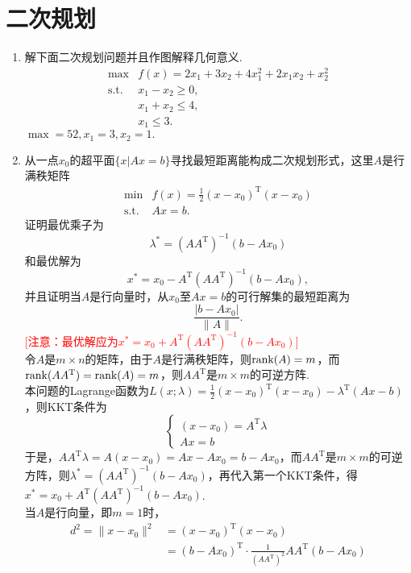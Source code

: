 \section{二次规划}
\begin{enumerate}
    \item 解下面二次规划问题并且作图解释几何意义.
    \[\begin{array}{lll}
        \max & f(x)=2x_1+3x_2+4x_1^2+2x_1x_2+x_2^2\\
        \mathrm{s.t.} & x_1-x_2 \geqslant 0,\\
        & x_1+x_2 \leqslant 4,\\
        & x_1 \leqslant 3.
    \end{array}\]
    \sol $\displaystyle \max=52,x_1=3,x_2=1.$
    \item 从一点$x_0$的超平面$\{x|Ax=b\}$寻找最短距离能构成二次规划形式，这里$A$是行满秩矩阵
    \[\begin{array}{lll}
        \min & \displaystyle f(x)=\frac{1}{2}(x-x_0)^\mathrm{T}(x-x_0)\\
        \mathrm{s.t.} & Ax=b.
    \end{array}\]
    证明最优乘子为\[\lambda^*=(AA^\mathrm{T})^{-1}(b-Ax_0)\]和最优解为\[x^*=x_0-A^\mathrm{T}(AA^\mathrm{T})^{-1}(b-Ax_0),\]
    并且证明当$A$是行向量时，从$x_0$至$Ax = b$的可行解集的最短距离为\[\frac{|b-Ax_0|}{\|A\|}.\]
    \textcolor{red}{[注意：最优解应为$x^*=x_0+A^\mathrm{T}(AA^\mathrm{T})^{-1}(b-Ax_0)$]}\\
    \pro 令$A$是$m \times n$的矩阵，由于$A$是行满秩矩阵，则$\text{rank}(A)=m$，而$\text{rank}(AA^\mathrm{T})=\text{rank}(A)=m$，则$AA^\mathrm{T}$是$m \times m$的可逆方阵.\\
    本问题的Lagrange函数为$\displaystyle L(x;\lambda)=\frac{1}{2}(x-x_0)^\mathrm{T}(x-x_0)-\lambda^\mathrm{T}(Ax-b)$，则KKT条件为
    \[\begin{cases}
        (x-x_0)=A^\mathrm{T}\lambda\\
        Ax=b
    \end{cases}\]
    于是，$AA^\mathrm{T}\lambda=A(x-x_0)=Ax-Ax_0=b-Ax_0$，而$AA^\mathrm{T}$是$m \times m$的可逆方阵，则$\lambda^*=(AA^\mathrm{T})^{-1}(b-Ax_0)$，再代入第一个KKT条件，得$x^*=x_0+A^\mathrm{T}(AA^\mathrm{T})^{-1}(b-Ax_0)$.\\
    当$A$是行向量，即$m=1$时，
    \begin{align*}
        d^2 = \|x-x_0\|^2 & =(x-x_0)^\mathrm{T}(x-x_0)\\
        &=(b-Ax_0)^\mathrm{T}\cdot \frac{1}{(AA^\mathrm{T})^2}AA^\mathrm{T}(b-Ax_0)\\

\end{align*}
\end{enumerate}
